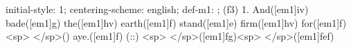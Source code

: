 initial-style: 1;
centering-scheme: english;
def-m1: \grealign;
(f3) 1. And([em1]iv) bade([em1]g) the([em1]hv) earth([em1]f) stand([em1]e) firm([em1]hv) for([em1]f) <sp> </sp>() aye.([em1]f) (::) <sp> </sp>([em1]fg)<sp>   </sp>([em1]fef)